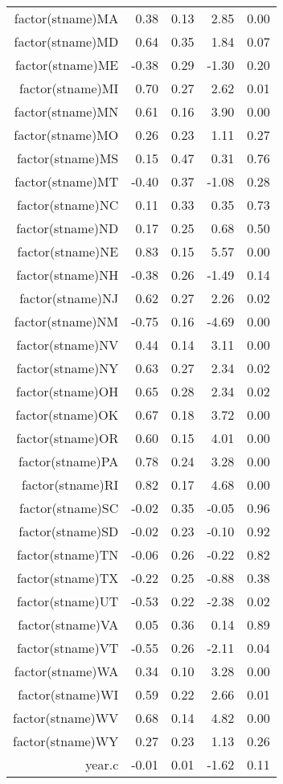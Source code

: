 \begin{table}[ht]
\begin{tabular}{rrrrr}
  factor(stname)MA & 0.38 & 0.13 & 2.85 & 0.00 \\ 
  factor(stname)MD & 0.64 & 0.35 & 1.84 & 0.07 \\ 
  factor(stname)ME & -0.38 & 0.29 & -1.30 & 0.20 \\ 
  factor(stname)MI & 0.70 & 0.27 & 2.62 & 0.01 \\ 
  factor(stname)MN & 0.61 & 0.16 & 3.90 & 0.00 \\ 
  factor(stname)MO & 0.26 & 0.23 & 1.11 & 0.27 \\ 
  factor(stname)MS & 0.15 & 0.47 & 0.31 & 0.76 \\ 
  factor(stname)MT & -0.40 & 0.37 & -1.08 & 0.28 \\ 
  factor(stname)NC & 0.11 & 0.33 & 0.35 & 0.73 \\ 
  factor(stname)ND & 0.17 & 0.25 & 0.68 & 0.50 \\ 
  factor(stname)NE & 0.83 & 0.15 & 5.57 & 0.00 \\ 
  factor(stname)NH & -0.38 & 0.26 & -1.49 & 0.14 \\ 
  factor(stname)NJ & 0.62 & 0.27 & 2.26 & 0.02 \\ 
  factor(stname)NM & -0.75 & 0.16 & -4.69 & 0.00 \\ 
  factor(stname)NV & 0.44 & 0.14 & 3.11 & 0.00 \\ 
  factor(stname)NY & 0.63 & 0.27 & 2.34 & 0.02 \\ 
  factor(stname)OH & 0.65 & 0.28 & 2.34 & 0.02 \\ 
  factor(stname)OK & 0.67 & 0.18 & 3.72 & 0.00 \\ 
  factor(stname)OR & 0.60 & 0.15 & 4.01 & 0.00 \\ 
  factor(stname)PA & 0.78 & 0.24 & 3.28 & 0.00 \\ 
  factor(stname)RI & 0.82 & 0.17 & 4.68 & 0.00 \\ 
  factor(stname)SC & -0.02 & 0.35 & -0.05 & 0.96 \\ 
  factor(stname)SD & -0.02 & 0.23 & -0.10 & 0.92 \\ 
  factor(stname)TN & -0.06 & 0.26 & -0.22 & 0.82 \\ 
  factor(stname)TX & -0.22 & 0.25 & -0.88 & 0.38 \\ 
  factor(stname)UT & -0.53 & 0.22 & -2.38 & 0.02 \\ 
  factor(stname)VA & 0.05 & 0.36 & 0.14 & 0.89 \\ 
  factor(stname)VT & -0.55 & 0.26 & -2.11 & 0.04 \\ 
  factor(stname)WA & 0.34 & 0.10 & 3.28 & 0.00 \\ 
  factor(stname)WI & 0.59 & 0.22 & 2.66 & 0.01 \\ 
  factor(stname)WV & 0.68 & 0.14 & 4.82 & 0.00 \\ 
  factor(stname)WY & 0.27 & 0.23 & 1.13 & 0.26 \\ 
  year.c & -0.01 & 0.01 & -1.62 & 0.11 \\ 
   \hline
\end{tabular}
\end{table}
